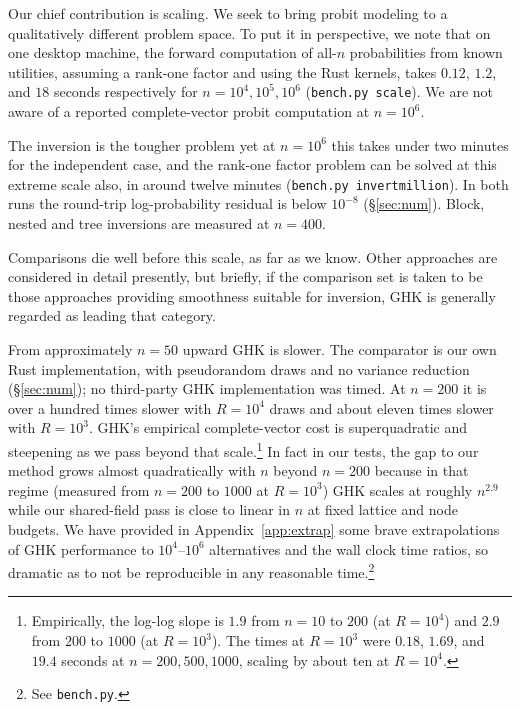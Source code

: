\documentclass[11pt]{article}
\begin{document}
Our chief contribution is scaling. We seek to bring probit modeling to a qualitatively different problem space.  To put it in perspective, we note that on one desktop machine, the forward computation of all-$n$ probabilities from known utilities, assuming a rank-one factor and using the Rust kernels, takes $0.12$, $1.2$, and $18$ seconds respectively for $n=10^{4},10^{5},10^{6}$ (\texttt{bench.py scale}). We are not aware of a reported complete-vector probit computation at $n=10^{6}$.

The inversion is the tougher problem yet at $n=10^{6}$ this takes under two minutes for the independent case, and the rank-one factor problem can be solved at this
extreme scale also, in around twelve minutes (\texttt{bench.py invertmillion}). In both runs the round-trip log-probability residual is below $10^{-8}$ (\S\ref{sec:num}). Block, nested and tree inversions are measured at $n=400$.

Comparisons die well before this scale, as far as we know. Other approaches are considered in detail presently, but briefly, if the comparison set is taken to be those approaches providing smoothness suitable for inversion, GHK is generally regarded as leading that category.

From approximately $n=50$ upward GHK is slower. The comparator is our own Rust implementation, with pseudorandom draws and no variance reduction (\S\ref{sec:num}); no third-party GHK implementation was timed. At $n=200$ it is over a hundred times slower with $R=10^{4}$ draws and about eleven times slower with $R=10^{3}$. GHK's empirical complete-vector cost is superquadratic and steepening as we pass beyond that scale.\footnote{Empirically, the log-log slope is
$1.9$ from $n=10$ to $200$ (at $R=10^{4}$) and $2.9$ from $200$ to $1000$
(at $R=10^{3}$). The times at $R=10^{3}$ were $0.18$, $1.69$, and $19.4$
seconds at $n=200,500,1000$, scaling by about ten at $R=10^{4}$.} In fact in our tests, the gap to our method grows almost quadratically with $n$ beyond $n=200$ because in that regime (measured from $n=200$ to $1000$ at $R=10^{3}$) GHK scales at roughly $n^{2.9}$ while our shared-field pass is close to linear in $n$ at fixed
lattice and node budgets. We have provided in Appendix~\ref{app:extrap} some brave extrapolations of GHK performance to
$10^{4}$--$10^{6}$ alternatives and the wall clock time ratios, so dramatic as to not be reproducible in any reasonable time.\footnote{See \texttt{bench.py}.}
\end{document}
